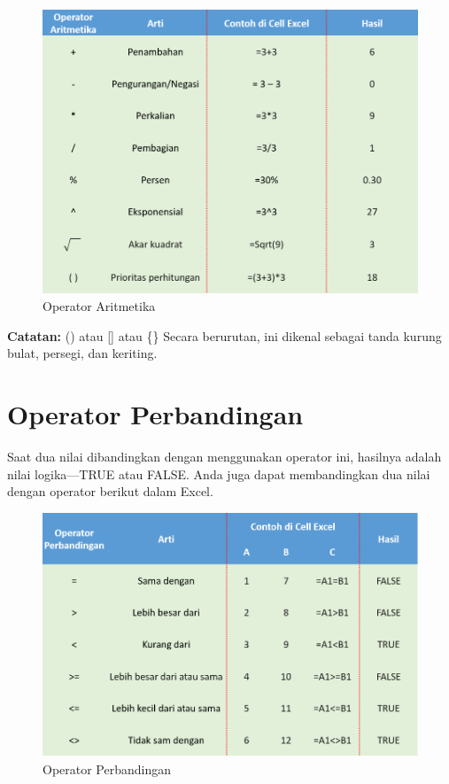 \documentclass[
]{book}
\begin{document}
\begin{figure}

{\centering \includegraphics[width=0.75\linewidth]{images/aritmatika} 

}

\caption{Operator Aritmetika}\label{fig:aritmatika}
\end{figure}

\textbf{Catatan:} () atau {[}{]} atau \{\} Secara berurutan, ini dikenal sebagai tanda kurung bulat, persegi, dan keriting.

\hypertarget{operator-perbandingan}{%
\section{Operator Perbandingan}\label{operator-perbandingan}}

Saat dua nilai dibandingkan dengan menggunakan operator ini, hasilnya adalah nilai logika---TRUE atau FALSE. Anda juga dapat membandingkan dua nilai dengan operator berikut dalam Excel.

\begin{figure}

{\centering \includegraphics[width=0.75\linewidth]{images/perbandingan} 

}

\caption{Operator Perbandingan}\label{fig:perbandingan}
\end{figure}
\end{document}
